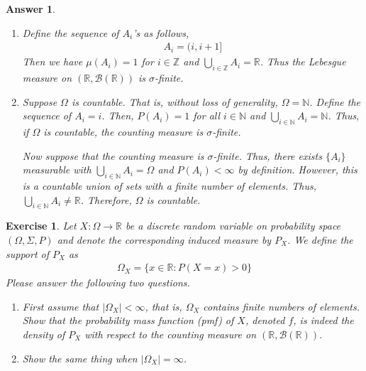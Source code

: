 \documentclass[12pt]{article}
\theoremstyle{colon}
\newtheorem{exercise}{Exercise}
\newtheorem*{answer}{Answer}
\begin{document}
\begin{answer}
  \leavevmode
  \begin{enumerate}[label=\arabic*)]
    \item Define the sequence of $A_i$'s as follows,
      \begin{gather*}
        A_i = (i, i+1]
      \end{gather*}
      Then we have $\mu(A_i) = 1$ for $i \in \mathbb{Z}$ and $\bigcup_{i \in \mathbb{Z}} A_i = \mathbb{R}$. Thus the Lebesgue measure on $(\mathbb{R}, \mathcal{B}(\mathbb{R}))$ is $\sigma$-finite.
    \item Suppose $\Omega$ is countable. That is, without loss of generality, $\Omega = \mathbb{N}$. Define the sequence of $A_i = i$. Then, $P(A_i) = 1$ for all $i \in \mathbb{N}$ and $\bigcup_{i \in \mathbb{N}} A_i = \mathbb{N}$. Thus, if $\Omega$ is countable, the counting measure is $\sigma$-finite.

    Now suppose that the counting measure is $\sigma$-finite. Thus, there exists $\{ A_i \}$ measurable with $\bigcup_{i \in \mathbb{N}} A_i = \Omega$ and $P(A_i) < \infty$ by definition. However, this is a countable union of sets with a finite number of elements. Thus, $\bigcup_{i \in \mathbb{N}} A_i \neq \mathbb{R}$. Therefore, $\Omega$ is countable.
  \end{enumerate}
\end{answer}

\clearpage

\begin{exercise}
  Let $X: \Omega \rightarrow \mathbb{R}$ be a discrete random variable on probability space $(\Omega, \Sigma, P)$ and denote the corresponding induced measure by $P_X$. We define the support of $P_X$ as
  \begin{gather*}
    \Omega_X = \{ x \in \mathbb{R}: P(X =x) > 0 \}
  \end{gather*}
  Please answer the following two questions.
  \begin{enumerate}[label=\arabic*)]
    \item First assume that $\lvert \Omega_X \rvert < \infty$, that is, $\Omega_X$ contains finite numbers of elements. Show that the probability mass function (pmf) of $X$, denoted $f$, is indeed the density of $P_X$ with respect to the counting measure on $(\mathbb{R}, \mathcal{B}(\mathbb{R}))$.
    \item Show the same thing when $\lvert \Omega_X \rvert = \infty$.
  \end{enumerate}
\end{exercise}
\end{document}

